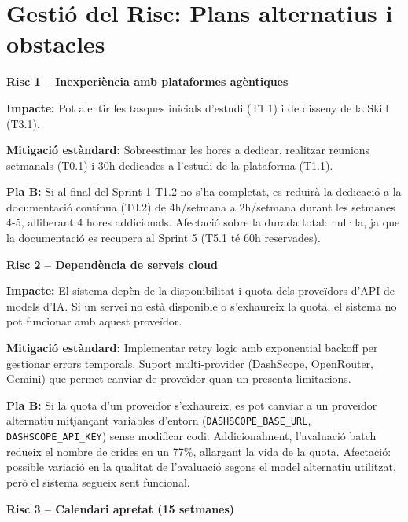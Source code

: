 \documentclass[12pt,a4paper,twoside]{report}
\begin{document}
\chapter{Gesti\'o del Risc: Plans alternatius i obstacles}
\label{chap:riscos}

\textbf{Risc 1 -- Inexperi\`encia amb plataformes ag\`entiques}

\textbf{Impacte:} Pot alentir les tasques inicials d'estudi (T1.1) i de disseny de la Skill (T3.1).

\textbf{Mitigaci\'o est\`andard:} Sobreestimar les hores a dedicar, realitzar reunions setmanals (T0.1) i 30h dedicades a l'estudi de la plataforma (T1.1).

\textbf{Pla B:} Si al final del Sprint 1 T1.2 no s'ha completat, es reduir\`a la dedicaci\'o a la documentaci\'o cont\'inua (T0.2) de 4h/setmana a 2h/setmana durant les setmanes 4-5, alliberant 4 hores addicionals. Afectaci\'o sobre la durada total: nul·la, ja que la documentaci\'o es recupera al Sprint 5 (T5.1 t\'e 60h reservades).

\vspace{0.5cm}

\textbf{Risc 2 -- Depend\`encia de serveis cloud}

\textbf{Impacte:} El sistema dep\`en de la disponibilitat i quota dels prove\"idors d'API de models d'IA. Si un servei no est\`a disponible o s'exhaureix la quota, el sistema no pot funcionar amb aquest prove\"idor.

\textbf{Mitigaci\'o est\`andard:} Implementar retry logic amb exponential backoff per gestionar errors temporals. Suport multi-provider (DashScope, OpenRouter, Gemini) que permet canviar de prove\"idor quan un presenta limitacions.

\textbf{Pla B:} Si la quota d'un prove\"idor s'exhaureix, es pot canviar a un prove\"idor alternatiu mitjan\c{c}ant variables d'entorn (\texttt{DASHSCOPE\_BASE\_URL}, \texttt{DASHSCOPE\_API\_KEY}) sense modificar codi. Addicionalment, l'avaluaci\'o batch redueix el nombre de crides en un 77\%, allargant la vida de la quota. Afectaci\'o: possible variaci\'o en la qualitat de l'avaluaci\'o segons el model alternatiu utilitzat, per\`o el sistema segueix sent funcional.

\vspace{0.5cm}

\textbf{Risc 3 -- Calendari apretat (15 setmanes)}
\end{document}
